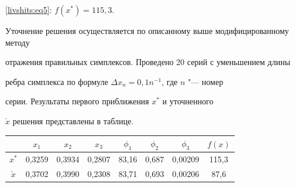 \eqref{livshits:eq5}: $f(x^\ast )=115,3$.



Уточнение решения осуществляется по описанному выше модифицированному методу

отражения правильных симплексов. Проведено 20 серий с уменьшением длины

ребра симплекса по формуле $\Delta x_n =0,1n^{-1}$, где $n$ "--- номер

серии. Результаты первого приближения $x^\ast$ и уточненного

$\check{x}$ решения представлены в таблице.



\begin{table}[h!]\centering \small

\begin{tabular}{|c|c|c|c|c|c|c|c|} \hline

 &

$x_1 $&

$x_2 $&

$x_3 $&

$\phi _1 $&

$\phi _2 $&

$\phi _3 $&

$f(x)$ \\

\hline

$x^\ast $&

0,3259&

0,3934&

0,2807&

83,16&

0,687&

0,00209&

115,3 \\

\hline

$\check{x}$&

0,3702&

0,3990&

0,2308&

83,71&

0,693&

0,00206&

87,6 \\

\hline

\end{tabular}

\end{table}



